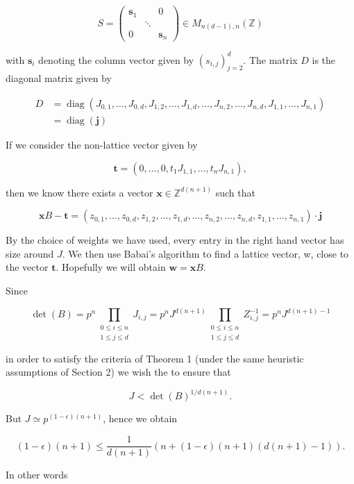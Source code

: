 \documentclass[10pt]{article}
\begin{document}
$$
S=\left(\begin{array}{ccc}
\mathbf{s}_{1} & & 0 \\
& \ddots & \\
0 & & \mathbf{s}_{n}
\end{array}\right) \in M_{n(d-1), n}(\mathbb{Z})
$$

with $\mathbf{s}_{i}$ denoting the column vector given by $\left(s_{i, j}\right)_{j=2}^{d}$. The matrix $D$ is the diagonal matrix given by

$$
\begin{aligned}
D & =\operatorname{diag}\left(J_{0,1}, \ldots, J_{0, d}, J_{1,2}, \ldots, J_{1, d}, \ldots, J_{n, 2}, \ldots, J_{n, d}, J_{1,1}, \ldots, J_{n, 1}\right) \\
& =\operatorname{diag}(\mathbf{j})
\end{aligned}
$$

If we consider the non-lattice vector given by

$$
\mathbf{t}=\left(0, \ldots, 0, t_{1} J_{1,1}, \ldots, t_{n} J_{n, 1}\right),
$$

then we know there exists a vector $\mathbf{x} \in \mathbb{Z}^{d(n+1)}$ such that

$$
\mathbf{x} B-\mathbf{t}=\left(z_{0,1}, \ldots, z_{0, d}, z_{1,2}, \ldots, z_{1, d}, \ldots, z_{n, 2}, \ldots, z_{n, d}, z_{1,1}, \ldots, z_{n, 1}\right) \cdot \mathbf{j}
$$

By the choice of weights we have used, every entry in the right hand vector has size around $J$. We then use Babai's algorithm to find a lattice vector, w, close to the vector $\mathbf{t}$. Hopefully we will obtain $\mathbf{w}=\mathbf{x} B$.

Since

$$
\operatorname{det}(B)=p^{n} \prod_{\substack{0 \leq i \leq n \\ 1 \leq j \leq d}} J_{i, j}=p^{n} J^{d(n+1)} \prod_{\substack{0 \leq i \leq n \\ 1 \leq j \leq d}} Z_{i, j}^{-1}=p^{n} J^{d(n+1)-1}
$$

in order to satisfy the criteria of Theorem 1 (under the same heuristic assumptions of Section 2) we wish the to ensure that

$$
J<\operatorname{det}(B)^{1 / d(n+1)} .
$$

But $J \simeq p^{(1-\epsilon)(n+1)}$, hence we obtain

$$
(1-\epsilon)(n+1) \leq \frac{1}{d(n+1)}(n+(1-\epsilon)(n+1)(d(n+1)-1)) .
$$

In other words
\end{document}
